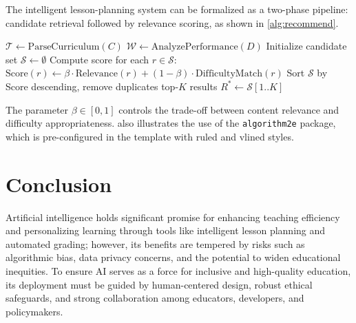 The intelligent lesson-planning system can be formalized as a two-phase pipeline: candidate retrieval followed by relevance scoring, as shown in \cref{alg:recommend}.

\begin{algorithm}[ht]
	\BlankLine
	$\mathcal{T} \gets \text{ParseCurriculum}(C)$ 
	$\mathcal{W} \gets \text{AnalyzePerformance}(D)$ 
	Initialize candidate set $\mathcal{S} \gets \emptyset$\;
	Compute score for each $r \in \mathcal{S}$: $\text{Score}(r) \gets \beta \cdot \text{Relevance}(r) + (1-\beta) \cdot \text{DifficultyMatch}(r)$\;
	Sort $\mathcal{S}$ by Score descending, remove duplicates\;
	\Return top-$K$ results $R^* \gets \mathcal{S}[1..K]$\;
	\caption{AI-driven lesson resource recommendation}
	\label{alg:recommend}
\end{algorithm}

The parameter $\beta \in [0,1]$ controls the trade-off between content relevance and difficulty appropriateness.  also illustrates the use of the \texttt{algorithm2e} package, which is pre-configured in the template with ruled and vlined styles.

\section{Conclusion}
Artificial intelligence holds significant promise for enhancing teaching efficiency and personalizing learning through tools like intelligent lesson planning and automated grading; however, its benefits are tempered by risks such as algorithmic bias, data privacy concerns, and the potential to widen educational inequities. To ensure AI serves as a force for inclusive and high-quality education, its deployment must be guided by human-centered design, robust ethical safeguards, and strong collaboration among educators, developers, and policymakers.
